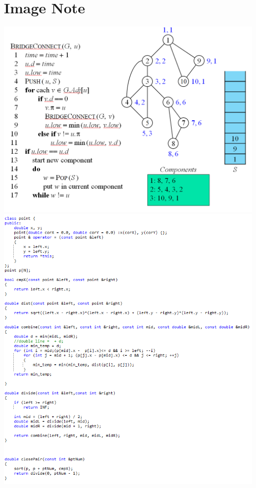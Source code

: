 \documentclass[a4paper, landscape, 8pt]{article}
\begin{document}
\section{Image Note}
\includegraphics[]{BridgeConnect} \clearpage
\includegraphics[]{ClosePair} \clearpage
\end{document}
